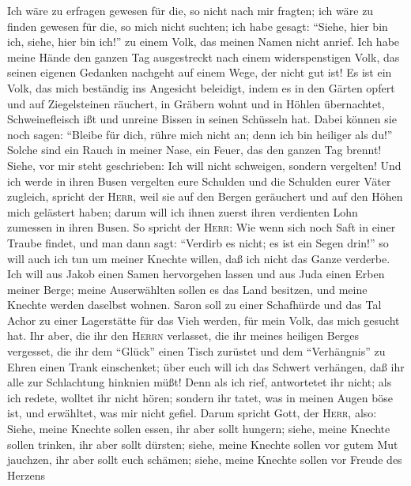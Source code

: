  Ich wäre zu erfragen gewesen für die, so nicht nach mir
fragten; ich wäre zu finden gewesen für die, so mich nicht suchten; ich
habe gesagt: ``Siehe, hier bin ich, siehe, hier bin ich!'' zu einem
Volk, das meinen Namen nicht anrief.  Ich habe meine Hände
den ganzen Tag ausgestreckt nach einem widerspenstigen Volk, das seinen
eigenen Gedanken nachgeht auf einem Wege, der nicht gut ist!
 Es ist ein Volk, das mich beständig ins Angesicht
beleidigt, indem es in den Gärten opfert und auf Ziegelsteinen räuchert,
 in Gräbern wohnt und in Höhlen übernachtet,
Schweinefleisch ißt und unreine Bissen in seinen Schüsseln hat.
 Dabei können sie noch sagen: ``Bleibe für dich, rühre
mich nicht an; denn ich bin heiliger als du!'' Solche sind ein Rauch in
meiner Nase, ein Feuer, das den ganzen Tag brennt!  Siehe,
vor mir steht geschrieben: Ich will nicht schweigen, sondern vergelten!
 Und ich werde in ihren Busen vergelten eure Schulden und
die Schulden eurer Väter zugleich, spricht der \textsc{Herr}, weil sie
auf den Bergen geräuchert und auf den Höhen mich gelästert haben; darum
will ich ihnen zuerst ihren verdienten Lohn zumessen in ihren Busen.
 So spricht der \textsc{Herr}: Wie wenn sich noch Saft in
einer Traube findet, und man dann sagt: ``Verdirb es nicht; es ist ein
Segen drin!'' so will auch ich tun um meiner Knechte willen, daß ich
nicht das Ganze verderbe.  Ich will aus Jakob einen Samen
hervorgehen lassen und aus Juda einen Erben meiner Berge; meine
Auserwählten sollen es das Land besitzen, und meine Knechte werden
daselbst wohnen.  Saron soll zu einer Schafhürde und das
Tal Achor zu einer Lagerstätte für das Vieh werden, für mein Volk, das
mich gesucht hat.  Ihr aber, die ihr den \textsc{Herrn}
verlasset, die ihr meines heiligen Berges vergesset, die ihr dem
``Glück'' einen Tisch zurüstet und dem ``Verhängnis'' zu Ehren einen
Trank einschenket;  über euch will ich das Schwert
verhängen, daß ihr alle zur Schlachtung hinknien müßt! Denn als ich
rief, antwortetet ihr nicht; als ich redete, wolltet ihr nicht hören;
sondern ihr tatet, was in meinen Augen böse ist, und erwähltet, was mir
nicht gefiel.  Darum spricht Gott, der \textsc{Herr},
also: Siehe, meine Knechte sollen essen, ihr aber sollt hungern; siehe,
meine Knechte sollen trinken, ihr aber sollt dürsten; siehe, meine
Knechte sollen vor gutem Mut jauchzen, ihr aber sollt euch schämen;
 siehe, meine Knechte sollen vor Freude des Herzens
